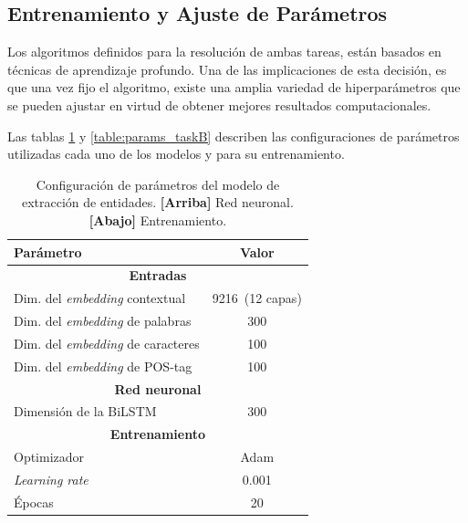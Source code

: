 \subsection{Entrenamiento y Ajuste de Parámetros}\label{sec:training}

Los algoritmos definidos para la resolución de ambas tareas, están basados en técnicas de aprendizaje profundo.
Una de las implicaciones de esta decisión, es que una vez fijo el algoritmo, existe una amplia variedad de hiperparámetros que se pueden ajustar en virtud de obtener mejores resultados computacionales.

Las tablas \ref{table:params_taskA} y \ref{table:params_taskB} describen las configuraciones de parámetros utilizadas cada uno de los modelos y para su entrenamiento.

\begin{table}[tb]\centering
		\begin{tabular}{lc}
			\hline
			\textbf{Parámetro} & \textbf{Valor} \\
			\hline
			\hline
			\multicolumn{2}{c}{\textbf{Entradas}}\\
			\hline
			\hline
			Dim. del \textit{embedding} contextual & 9216~(12 capas)\\
			Dim. del \textit{embedding} de palabras & 300\\
			Dim. del \textit{embedding} de caracteres & 100\\
			Dim. del \textit{embedding} de POS-tag & 100\\
			
			\hline
			\hline
			\multicolumn{2}{c}{\textbf{Red neuronal}}\\
			\hline
			\hline
			
			Dimensión de la BiLSTM & 300\\
			
			\hline
			\hline
			\multicolumn{2}{c}{\textbf{Entrenamiento}}\\
			\hline
			\hline
			
			Optimizador & Adam\\
			\textit{Learning rate} & 0.001\\
			Épocas & 20\\
			
			\hline
			
		\end{tabular}
	
	\caption{Configuración de parámetros del modelo de extracción de entidades. \textbf{[Arriba]} Red neuronal. \textbf{[Abajo]} Entrenamiento.}\label{table:params_taskA}
	
\end{table}

